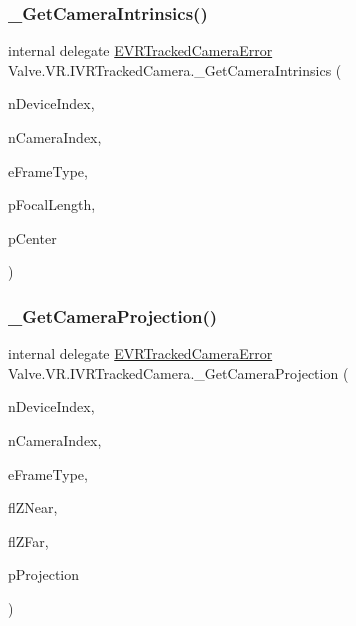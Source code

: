 \mbox{\label{struct_valve_1_1_v_r_1_1_i_v_r_tracked_camera_aacef66b75e9aea2e3f8e98c36f7f8c9a}} 
\subsubsection{\texorpdfstring{\_GetCameraIntrinsics()}{\_GetCameraIntrinsics()}}
{\footnotesize\ttfamily internal delegate \mbox{\hyperlink{namespace_valve_1_1_v_r_ad0e012e846f5d93848783c044614cfd3}{E\+V\+R\+Tracked\+Camera\+Error}} Valve.\+V\+R.\+I\+V\+R\+Tracked\+Camera.\+\_\+\+Get\+Camera\+Intrinsics (\begin{DoxyParamCaption}\item[{uint}]{n\+Device\+Index,  }\item[{uint}]{n\+Camera\+Index,  }\item[{\mbox{\hyperlink{namespace_valve_1_1_v_r_a9962211bc3fe98c2683db188c12c9afd}{E\+V\+R\+Tracked\+Camera\+Frame\+Type}}}]{e\+Frame\+Type,  }\item[{ref \mbox{\hyperlink{struct_valve_1_1_v_r_1_1_hmd_vector2__t}{Hmd\+Vector2\+\_\+t}}}]{p\+Focal\+Length,  }\item[{ref \mbox{\hyperlink{struct_valve_1_1_v_r_1_1_hmd_vector2__t}{Hmd\+Vector2\+\_\+t}}}]{p\+Center }\end{DoxyParamCaption})}

\mbox{\label{struct_valve_1_1_v_r_1_1_i_v_r_tracked_camera_a8c5bac72968c107773b0f8e5dc1b1bf1}} 
\subsubsection{\texorpdfstring{\_GetCameraProjection()}{\_GetCameraProjection()}}
{\footnotesize\ttfamily internal delegate \mbox{\hyperlink{namespace_valve_1_1_v_r_ad0e012e846f5d93848783c044614cfd3}{E\+V\+R\+Tracked\+Camera\+Error}} Valve.\+V\+R.\+I\+V\+R\+Tracked\+Camera.\+\_\+\+Get\+Camera\+Projection (\begin{DoxyParamCaption}\item[{uint}]{n\+Device\+Index,  }\item[{uint}]{n\+Camera\+Index,  }\item[{\mbox{\hyperlink{namespace_valve_1_1_v_r_a9962211bc3fe98c2683db188c12c9afd}{E\+V\+R\+Tracked\+Camera\+Frame\+Type}}}]{e\+Frame\+Type,  }\item[{float}]{fl\+Z\+Near,  }\item[{float}]{fl\+Z\+Far,  }\item[{ref \mbox{\hyperlink{struct_valve_1_1_v_r_1_1_hmd_matrix44__t}{Hmd\+Matrix44\+\_\+t}}}]{p\+Projection }\end{DoxyParamCaption})}

